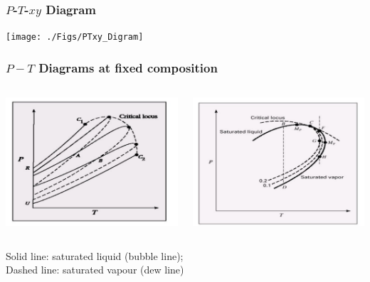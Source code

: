 \documentclass[10pt,compress,handout,ignorenonframetext,unknownkeysallowed]{beamer}
\begin{document}
\begin{frame}
  \frametitle{$P$-$T$-$xy$ Diagram}
     \begin{center}
       \texttt{[image: ./Figs/PTxy\_Digram]} %
     \end{center}
\end{frame}
\normalsize



\begin{frame}
  \frametitle{$P-T$ Diagrams at fixed composition}
  \begin{columns}
     \begin{column}[l]{0.5\linewidth}
        \includegraphics[width=\linewidth,clip]{./../Pics/VLE_PT_diagram1}
     \end{column}
     \begin{column}[l]{0.5\linewidth}
        \includegraphics[width=\linewidth,clip]{./../Pics/VLE_PT_diagram2}
     \end{column}
  \end{columns}
  \begin{center}
     Solid line: saturated liquid (bubble line); \\
     Dashed line: saturated vapour (dew line) 
  \end{center}
\end{frame}
\normalsize
\end{document}

